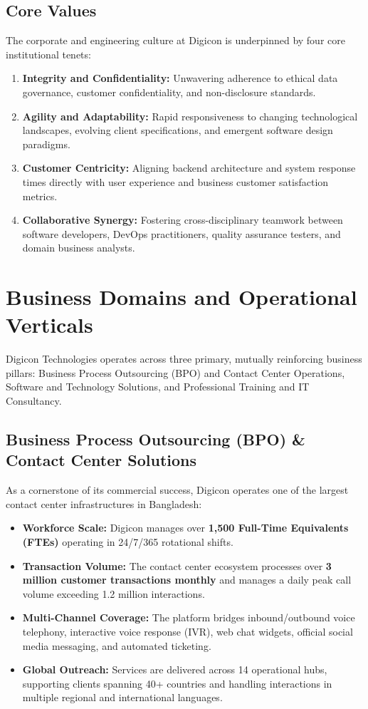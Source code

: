 \subsection{Core Values}
The corporate and engineering culture at Digicon is underpinned by four core institutional tenets:
\begin{enumerate}
    \item \textbf{Integrity and Confidentiality:} Unwavering adherence to ethical data governance, customer confidentiality, and non-disclosure standards.
    \item \textbf{Agility and Adaptability:} Rapid responsiveness to changing technological landscapes, evolving client specifications, and emergent software design paradigms.
    \item \textbf{Customer Centricity:} Aligning backend architecture and system response times directly with user experience and business customer satisfaction metrics.
    \item \textbf{Collaborative Synergy:} Fostering cross-disciplinary teamwork between software developers, DevOps practitioners, quality assurance testers, and domain business analysts.
\end{enumerate}

\section{Business Domains and Operational Verticals}
\label{sec:org_domains}

Digicon Technologies operates across three primary, mutually reinforcing business pillars: Business Process Outsourcing (BPO) and Contact Center Operations, Software and Technology Solutions, and Professional Training and IT Consultancy.

\subsection{Business Process Outsourcing (BPO) \& Contact Center Solutions}
As a cornerstone of its commercial success, Digicon operates one of the largest contact center infrastructures in Bangladesh:
\begin{itemize}
    \item \textbf{Workforce Scale:} Digicon manages over \textbf{1,500 Full-Time Equivalents (FTEs)} operating in 24/7/365 rotational shifts.
    \item \textbf{Transaction Volume:} The contact center ecosystem processes over \textbf{3 million customer transactions monthly} and manages a daily peak call volume exceeding 1.2 million interactions.
    \item \textbf{Multi-Channel Coverage:} The platform bridges inbound/outbound voice telephony, interactive voice response (IVR), web chat widgets, official social media messaging, and automated ticketing.
    \item \textbf{Global Outreach:} Services are delivered across 14 operational hubs, supporting clients spanning 40+ countries and handling interactions in multiple regional and international languages.
\end{itemize}

